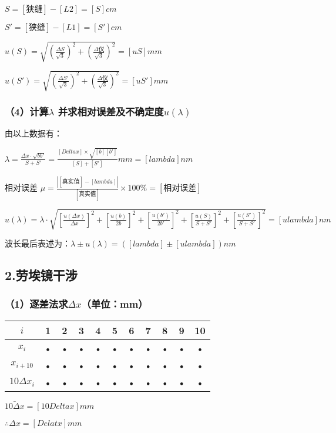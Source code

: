 \documentclass[11pt,a4paper,oneside]{article}
\begin{document}
$S = [狭缝] - [L2] = [S]cm$

$S' = [狭缝] - [L1] = [S']cm$

$u(S) = \sqrt{(\displaystyle\frac{\Delta S}{\sqrt{3}})^2+(\displaystyle\frac{\Delta 仪}{\sqrt{3}})^2} = [uS]mm$

$u(S') = \sqrt{(\displaystyle\frac{\Delta S'}{\sqrt{3}})^2+(\displaystyle\frac{\Delta 仪}{\sqrt{3}})^2} = [uS']mm$

\subsubsection{（4）计算$\lambda$ 并求相对误差及不确定度$u(\lambda )$}
由以上数据有：

$\lambda  = \displaystyle\frac{\Delta x\cdot \sqrt{bb'}}{S+S'} = \displaystyle\frac{[Delta x]\times \sqrt{[b][b']}}{[S]+[S']}mm = [lambda]nm$

相对误差 $\mu = \displaystyle\frac{\left | [真实值]-[lambda] \right |}{[真实值]} \times 100\% = [相对误差]$

$u(\lambda ) = \lambda \cdot \sqrt{\left [ \displaystyle\frac{u(\Delta x)}{\Delta x} \right ]^2+\left [ \displaystyle\frac{u(b)}{2b} \right ]^2+\left [ \displaystyle\frac{u(b')}{2b'} \right ]^2+\left [ \displaystyle\frac{u(S)}{S+S'} \right ]^2+\left [ \displaystyle\frac{u(S')}{S+S'} \right ]^2} = [ulambda]nm$

波长最后表述为：$\lambda \pm u(\lambda) = ([lambda]\pm [ulambda])nm$

\subsection{2.劳埃镜干涉}
\subsubsection{（1）逐差法求$\Delta x$（单位：mm）}
\begin{tabular}{|c|c|c|c|c|c|c|c|c|c|c|}
\hline 
$i$ & 1 & 2 & 3 & 4 & 5 & 6 & 7 & 8 & 9 & 10 \\ 
\hline 
$x_i$ & • & • & • & • & • & • & • & • & • & • \\ 
\hline 
$x_{i+10}$ & • & • & • & • & • & • & • & • & • & • \\ 
\hline 
$10\Delta x_i$ & • & • & • & • & • & • & • & • & • & • \\ 
\hline 
\end{tabular} 

$\bar{10\Delta x} = [10Delta x]mm$

$\therefore \Delta x = [Delat x]mm$
\end{document}
